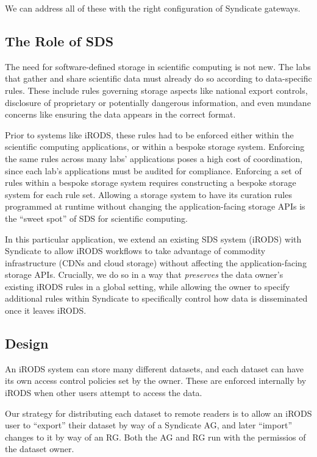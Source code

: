 We can address all of these with the right configuration of Syndicate gateways.

\subsection{The Role of SDS}

The need for software-defined storage in scientific computing is not new.  The
labs that gather and share scientific data must already do so according to
data-specific rules.  These include rules governing storage aspects like
national export controls, disclosure of proprietary or potentially dangerous information, and
even mundane concerns like ensuring the data appears in the correct format.

Prior to systems like iRODS, these rules had to be enforced either within the
scientific computing applications, or within a bespoke storage system.
Enforcing the same rules across many labs' applications poses a high cost of
coordination, since each lab's applications must be audited for compliance.
Enforcing a set of rules within a bespoke storage system requires constructing a
bespoke storage system for each rule set.  Allowing a storage system to have its
curation rules programmed at runtime without changing the application-facing
storage APIs is the ``sweet spot'' of SDS for scientific computing.

In this particular application, we extend an existing SDS system (iRODS) with
Syndicate to allow iRODS workflows to take advantage of commodity infrastructure
(CDNs and cloud storage) without affecting the application-facing storage APIs.
Crucially, we do so in a way that \emph{preserves} the data owner's existing iRODS
rules in a global setting, while allowing the owner to specify additional
rules within Syndicate to specifically control how data is disseminated once it
leaves iRODS.

\subsection{Design}

An iRODS system can store many different datasets, and each dataset can have its
own access control policies set by the owner.  These are enforced internally by
iRODS when other users attempt to access the data.

Our strategy for distributing each dataset to remote readers is to allow an
iRODS user to ``export'' their dataset by way of a Syndicate AG, and later
``import'' changes to it by way of an RG.  Both the AG and RG run with the
permissios of the dataset owner.

